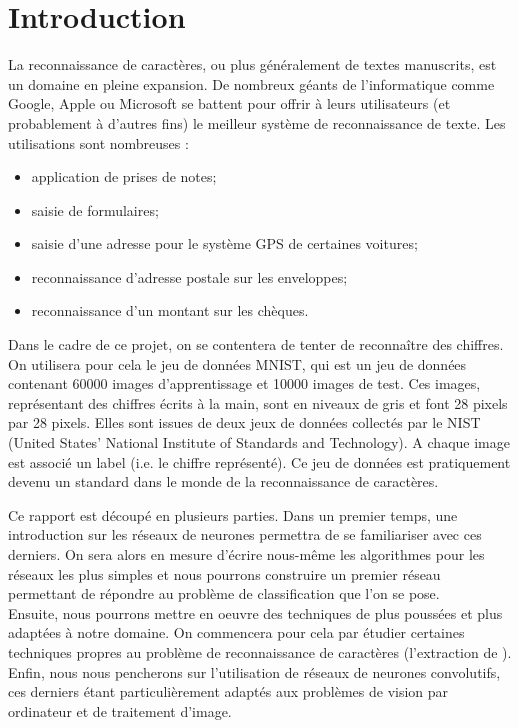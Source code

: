 
\chapter{Introduction}

La reconnaissance de caractères, ou plus généralement de textes manuscrits, est 
un domaine en pleine expansion. 
De nombreux géants de l'informatique comme Google, Apple ou Microsoft se battent pour 
offrir à leurs utilisateurs (et probablement à d'autres fins) le meilleur système 
de reconnaissance de texte. Les utilisations sont nombreuses :
\begin{itemize}
  \item application de prises de notes;
  \item saisie de formulaires;
  \item saisie d'une adresse pour le système GPS de certaines voitures;
  \item reconnaissance d'adresse postale sur les enveloppes;
  \item reconnaissance d'un montant sur les chèques.
\end{itemize}

\vspace{1em}

Dans le cadre de ce projet, on se contentera de tenter de reconnaître des chiffres. 
On utilisera pour cela le jeu de données MNIST, qui est un jeu de données contenant 
60000 images d'apprentissage et 10000 images de test. Ces images, représentant des 
chiffres écrits à la main, sont en niveaux de gris et font 28 pixels par 28 pixels.
Elles sont issues de deux jeux de données collectés par le NIST 
(United States' National Institute of Standards and Technology). 
A chaque image est associé un label (i.e.\/ le chiffre représenté). 
Ce jeu de données est pratiquement devenu un standard dans le monde de la 
reconnaissance de caractères.

Ce rapport est découpé en plusieurs parties. Dans un premier temps, une introduction 
sur les réseaux de neurones permettra de se familiariser avec ces derniers. 
On sera alors en mesure d'écrire nous-même les algorithmes pour les réseaux les 
plus simples et nous pourrons construire un premier réseau permettant de répondre 
au problème de classification que l'on se pose. \\
Ensuite, nous pourrons mettre en oeuvre des techniques de  
plus poussées et plus adaptées à notre domaine. On commencera pour cela par 
étudier certaines techniques propres au problème de reconnaissance de caractères
(l'extraction de ).
Enfin, nous nous pencherons sur l'utilisation de réseaux de neurones convolutifs, 
ces derniers étant particulièrement adaptés aux problèmes de vision par ordinateur 
et de traitement d'image.
